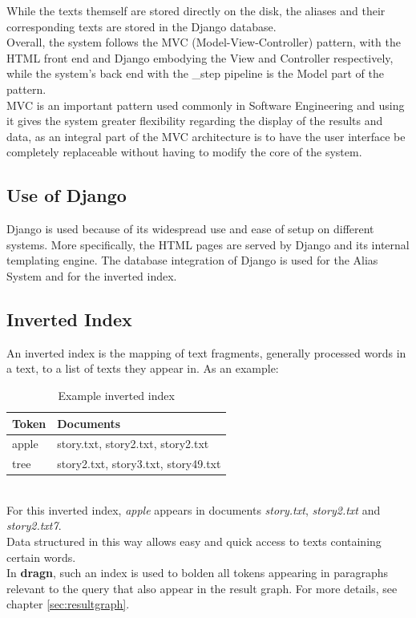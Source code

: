 While the texts themself are stored directly on the disk, the aliases and their corresponding texts are stored in the Django database.\\
Overall, the system follows the MVC (Model-View-Controller) pattern, with the HTML front end and Django embodying the View and Controller respectively, while the system's back end with the \_step pipeline is the Model part of the pattern.\\
MVC is an important pattern used commonly in Software Engineering and using it gives the system greater flexibility regarding the display of the results and data, as an integral part of the MVC architecture is to have the user interface be completely replaceable without having to modify the core of the system.

\subsection{Use of Django}
Django is used because of its widespread use and ease of setup on different systems. More specifically, the HTML pages are served by Django and its internal templating engine. The database integration of Django is used for the Alias System and for the inverted index.
\subsection{Inverted Index}
An inverted index is the mapping of text fragments, generally processed words in a text, to a list of texts they appear in. As an example:
\begin{table}[h!]
\centering
\caption{Example inverted index}
\label{table:inverted-index}
\begin{tabular}{l|l}
Token & Documents \\ \hline
apple & story.txt, story2.txt, story2.txt \\
tree & story2.txt, story3.txt, story49.txt 
\end{tabular}
\end{table}\\
For this inverted index, \textit{apple} appears in documents \textit{story.txt}, \textit{story2.txt} and \textit{story2.txt7}.\\
Data structured in this way allows easy and quick access to texts containing certain words.\\
In \textbf{dragn}, such an index is used to bolden all tokens appearing in paragraphs relevant to the query that also appear in the result graph. For more details, see chapter \ref{sec:resultgraph}.

